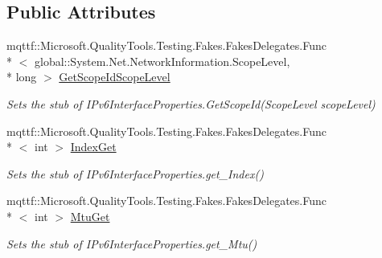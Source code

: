 \subsection*{Public Attributes}
\begin{DoxyCompactItemize}
\item 
mqttf\-::\-Microsoft.\-Quality\-Tools.\-Testing.\-Fakes.\-Fakes\-Delegates.\-Func\\*
$<$ global\-::\-System.\-Net.\-Network\-Information.\-Scope\-Level, \\*
long $>$ \hyperlink{class_system_1_1_net_1_1_network_information_1_1_fakes_1_1_stub_i_pv6_interface_properties_af2cc417617617bdf84b6a4911d11f09e}{Get\-Scope\-Id\-Scope\-Level}
\begin{DoxyCompactList}\small\item\em Sets the stub of I\-Pv6\-Interface\-Properties.\-Get\-Scope\-Id(\-Scope\-Level scope\-Level)\end{DoxyCompactList}\item 
mqttf\-::\-Microsoft.\-Quality\-Tools.\-Testing.\-Fakes.\-Fakes\-Delegates.\-Func\\*
$<$ int $>$ \hyperlink{class_system_1_1_net_1_1_network_information_1_1_fakes_1_1_stub_i_pv6_interface_properties_ad58d56e1eab47866144d57d93084b2d1}{Index\-Get}
\begin{DoxyCompactList}\small\item\em Sets the stub of I\-Pv6\-Interface\-Properties.\-get\-\_\-\-Index()\end{DoxyCompactList}\item 
mqttf\-::\-Microsoft.\-Quality\-Tools.\-Testing.\-Fakes.\-Fakes\-Delegates.\-Func\\*
$<$ int $>$ \hyperlink{class_system_1_1_net_1_1_network_information_1_1_fakes_1_1_stub_i_pv6_interface_properties_ac2c9c25fbe8ce11301868fb1778db716}{Mtu\-Get}
\begin{DoxyCompactList}\small\item\em Sets the stub of I\-Pv6\-Interface\-Properties.\-get\-\_\-\-Mtu()\end{DoxyCompactList}\end{DoxyCompactItemize}
